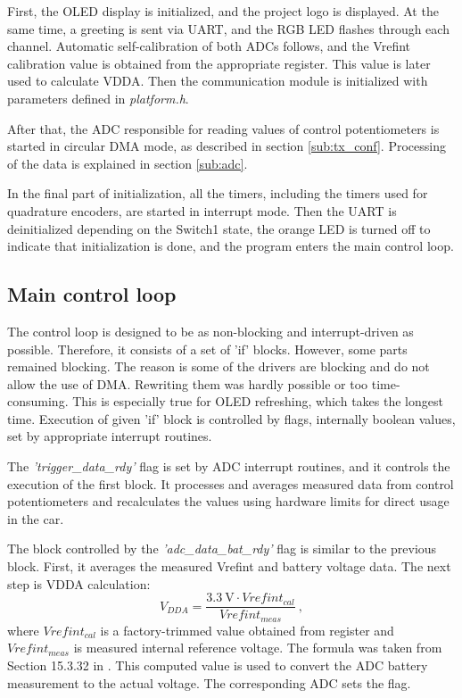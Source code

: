 First, the OLED display is initialized, and the project logo is displayed. At the same time, a greeting is sent via UART, and the RGB LED flashes through each channel. Automatic self-calibration of both ADCs follows, and the Vrefint calibration value is obtained from the appropriate register. This value is later used to calculate VDDA. Then the communication module is initialized with parameters defined in \textit{platform.h}.

After that, the ADC responsible for reading values of control potentiometers is started in circular DMA mode, as described in section \ref{sub:tx_conf}. Processing of the data is explained in section \ref{sub:adc}.

In the final part of initialization, all the timers, including the timers used for quadrature encoders, are started in interrupt mode. Then the UART is deinitialized depending on the Switch1 state, the orange LED is turned off to indicate that initialization is done, and the program enters the main control loop.

\subsection{Main control loop}
The control loop is designed to be as non-blocking and interrupt-driven as possible. Therefore, it consists of a set of 'if' blocks. However, some parts remained blocking. The reason is some of the drivers are blocking and do not allow the use of DMA. Rewriting them was hardly possible or too time-consuming. This is especially true for OLED refreshing, which takes the longest time. Execution of given 'if' block is controlled by flags, internally boolean values, set by appropriate interrupt routines.

The \textit{'trigger\_data\_rdy'} flag is set by ADC interrupt routines, and it controls the execution of the first block. It processes and averages measured data from control potentiometers and recalculates the values using hardware limits for direct usage in the car.

The block controlled by the \textit{'adc\_data\_bat\_rdy'} flag is similar to the previous block. First, it averages the measured Vrefint and battery voltage data. The next step is VDDA calculation:
\begin{equation}
	V_{DDA} = \frac{\SI{3.3}{\V} \cdot Vrefint_{cal}}{Vrefint_{meas}}\ ,
\end{equation}
where $Vrefint_{cal}$ is a factory-trimmed value obtained from register and $Vrefint_{meas}$ is measured internal reference voltage. The formula was taken from Section 15.3.32 in \cite{f303_ref}. This computed value is used to convert the ADC battery measurement to the actual voltage. The corresponding ADC sets the flag.

